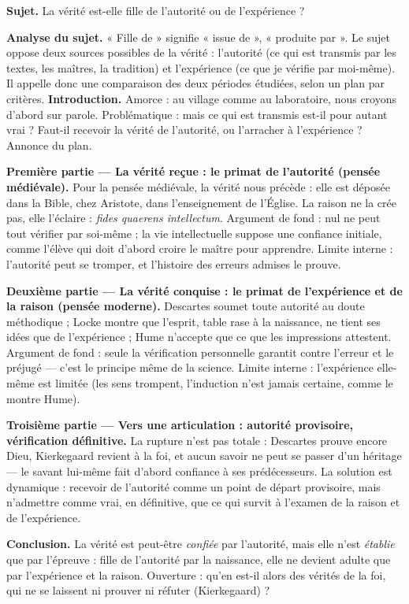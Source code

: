 \documentclass[11pt]{article}
\begin{document}
\begin{exoresolu}
\textbf{Sujet.} La vérité est-elle fille de l'autorité ou de l'expérience ?

\textbf{Analyse du sujet.} « Fille de » signifie « issue de », « produite par ». Le sujet oppose deux sources possibles de la vérité : l'autorité (ce qui est transmis par les textes, les maîtres, la tradition) et l'expérience (ce que je vérifie par moi-même). Il appelle donc une comparaison des deux périodes étudiées, selon un plan par critères.
\tcblower
\textbf{Introduction.} Amorce : au village comme au laboratoire, nous croyons d'abord sur parole. Problématique : mais ce qui est transmis est-il pour autant vrai ? Faut-il recevoir la vérité de l'autorité, ou l'arracher à l'expérience ? Annonce du plan.

\textbf{Première partie — La vérité reçue : le primat de l'autorité (pensée médiévale).} Pour la pensée médiévale, la vérité nous précède : elle est déposée dans la Bible, chez Aristote, dans l'enseignement de l'Église. La raison ne la crée pas, elle l'éclaire : \emph{fides quaerens intellectum}. Argument de fond : nul ne peut tout vérifier par soi-même ; la vie intellectuelle suppose une confiance initiale, comme l'élève qui doit d'abord croire le maître pour apprendre. Limite interne : l'autorité peut se tromper, et l'histoire des erreurs admises le prouve.

\textbf{Deuxième partie — La vérité conquise : le primat de l'expérience et de la raison (pensée moderne).} Descartes soumet toute autorité au doute méthodique ; Locke montre que l'esprit, table rase à la naissance, ne tient ses idées que de l'expérience ; Hume n'accepte que ce que les impressions attestent. Argument de fond : seule la vérification personnelle garantit contre l'erreur et le préjugé — c'est le principe même de la science. Limite interne : l'expérience elle-même est limitée (les sens trompent, l'induction n'est jamais certaine, comme le montre Hume).

\textbf{Troisième partie — Vers une articulation : autorité provisoire, vérification définitive.} La rupture n'est pas totale : Descartes prouve encore Dieu, Kierkegaard revient à la foi, et aucun savoir ne peut se passer d'un héritage — le savant lui-même fait d'abord confiance à ses prédécesseurs. La solution est dynamique : recevoir de l'autorité comme un point de départ provisoire, mais n'admettre comme vrai, en définitive, que ce qui survit à l'examen de la raison et de l'expérience.

\textbf{Conclusion.} La vérité est peut-être \emph{confiée} par l'autorité, mais elle n'est \emph{établie} que par l'épreuve : fille de l'autorité par la naissance, elle ne devient adulte que par l'expérience et la raison. Ouverture : qu'en est-il alors des vérités de la foi, qui ne se laissent ni prouver ni réfuter (Kierkegaard) ?
\end{exoresolu}
\end{document}
